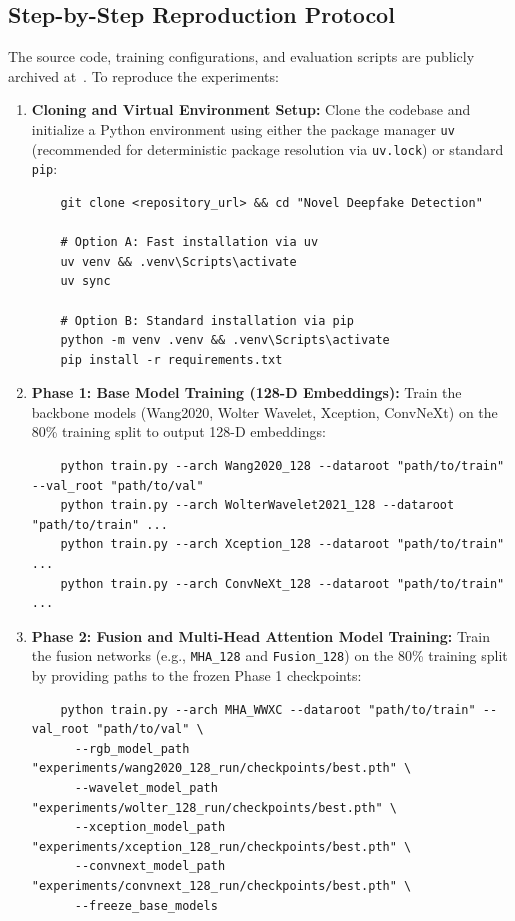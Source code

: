 \documentclass[fleqn,10pt]{wlscirep}
\begin{document}
\subsection*{Step-by-Step Reproduction Protocol}
The source code, training configurations, and evaluation scripts are publicly archived at~\cite{ref26}. To reproduce the experiments:
\begin{enumerate}
    \item \textbf{Cloning and Virtual Environment Setup:}
    Clone the codebase and initialize a Python environment using either the package manager \texttt{uv} (recommended for deterministic package resolution via \texttt{uv.lock}) or standard \texttt{pip}:
    \begin{verbatim}
    git clone <repository_url> && cd "Novel Deepfake Detection"
    
    # Option A: Fast installation via uv
    uv venv && .venv\Scripts\activate
    uv sync
    
    # Option B: Standard installation via pip
    python -m venv .venv && .venv\Scripts\activate
    pip install -r requirements.txt
    \end{verbatim}

    \item \textbf{Phase 1: Base Model Training (128-D Embeddings):}
    Train the backbone models (Wang2020, Wolter Wavelet, Xception, ConvNeXt) on the 80\% training split to output 128-D embeddings:
    \begin{verbatim}
    python train.py --arch Wang2020_128 --dataroot "path/to/train" --val_root "path/to/val"
    python train.py --arch WolterWavelet2021_128 --dataroot "path/to/train" ...
    python train.py --arch Xception_128 --dataroot "path/to/train" ...
    python train.py --arch ConvNeXt_128 --dataroot "path/to/train" ...
    \end{verbatim}

    \item \textbf{Phase 2: Fusion and Multi-Head Attention Model Training:}
    Train the fusion networks (e.g., \texttt{MHA\_128} and \texttt{Fusion\_128}) on the 80\% training split by providing paths to the frozen Phase 1 checkpoints:
    \begin{verbatim}
    python train.py --arch MHA_WWXC --dataroot "path/to/train" --val_root "path/to/val" \
      --rgb_model_path "experiments/wang2020_128_run/checkpoints/best.pth" \
      --wavelet_model_path "experiments/wolter_128_run/checkpoints/best.pth" \
      --xception_model_path "experiments/xception_128_run/checkpoints/best.pth" \
      --convnext_model_path "experiments/convnext_128_run/checkpoints/best.pth" \
      --freeze_base_models
    \end{verbatim}


\end{enumerate}
\end{document}
